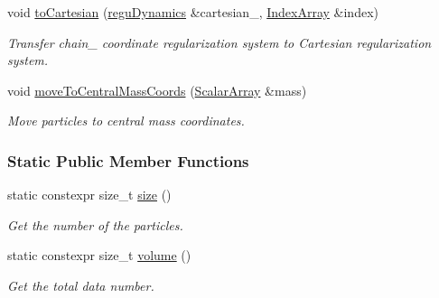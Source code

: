 \begin{DoxyCompactItemize}
void \mbox{\hyperlink{classregu_dynamics_a3dd8d377588308a02396ca6d06945859}{to\+Cartesian}} (\mbox{\hyperlink{classregu_dynamics}{regu\+Dynamics}} \&cartesian_, \mbox{\hyperlink{classregu_dynamics_a2c9fa7372e4a11be9d85728b4a0e455f}{Index\+Array}} \&index)
\begin{DoxyCompactList}\small\item\em Transfer chain_ coordinate regularization system to Cartesian regularization system. \end{DoxyCompactList}\item
void \mbox{\hyperlink{classregu_dynamics_adb57f1775922d615b8e506eaf79a1bc0}{move\+To\+Central\+Mass\+Coords}} (\mbox{\hyperlink{classregu_dynamics_a34b4b77ea3e49e1cdef584ec8bd281dc}{Scalar\+Array}} \&mass)
\begin{DoxyCompactList}\small\item\em Move particles to central mass coordinates. \end{DoxyCompactList}\end{DoxyCompactItemize}
\subsubsection*{Static Public Member Functions}
\begin{DoxyCompactItemize}
\item 
static constexpr size\+\_\+t \mbox{\hyperlink{classregu_dynamics_a794ed66952b542ae63caa936e3641c4a}{size}} ()
\begin{DoxyCompactList}\small\item\em Get the number of the particles. \end{DoxyCompactList}\item 
static constexpr size\+\_\+t \mbox{\hyperlink{classregu_dynamics_a3a00b2009ce88898871ca024c30c6882}{volume}} ()
\begin{DoxyCompactList}\small\item\em Get the total data number. \end{DoxyCompactList}\end{DoxyCompactItemize}
